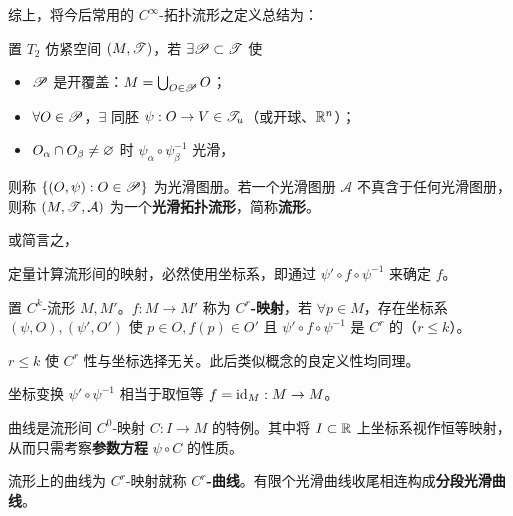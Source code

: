 综上，将今后常用的 $C^\infty$-拓扑流形之定义总结为：
\begin{tcolorbox}
\begin{definition}
    置 $T_2$ 仿紧空间 $(M,\mathscr T)$，若 $\exists\mathscr P\subset\mathscr T$ 使
    \begin{itemize}
        \item $\mathscr P$ 是开覆盖：$M = \bigcup_{O\in\mathscr P}O$；
        \item $\forall O\in\mathscr P$，$\exists$ 同胚 $\psi:O\to V\in\mathscr T_u$（或开球、$\mathbb{R}^n$）；
        \item $O_\alpha\cap O_\beta\ne\varnothing$ 时 $\psi_\alpha\circ\psi_\beta^{-1}$ 光滑，
    \end{itemize}
    则称 $\{(O,\psi):O\in\mathscr P\}$ 为光滑图册。若一个光滑图册 $\mathcal A$ 不真含于任何光滑图册，则称 $(M,\mathscr T,\mathcal A)$ 为一个\textbf{光滑拓扑流形}，简称\textbf{流形}。
\end{definition}
\end{tcolorbox}
或简言之，
\begin{center}
\end{center}

定量计算流形间的映射，必然使用坐标系，即通过 $\psi'\circ f\circ \psi^{-1}$ 来确定 $f$。
\begin{definition}
    置 $C^k$-流形 $M,M'$。$f:M\to M'$ 称为 $C^r$\textbf{-映射}，若 $\forall p\in M$，存在坐标系 $(\psi,O),(\psi',O')$ 使 $p\in O,f(p)\in O'$ 且 $\psi'\circ f\circ \psi^{-1}$ 是 $C^r$ 的（$r\leqslant k$）。
\end{definition}

\begin{remark}
    $r\leqslant k$ 使 $C^r$ 性与坐标选择无关。此后类似概念的良定义性均同理。
\end{remark}

\begin{example}
    坐标变换 $\psi'\circ \psi^{-1}$ 相当于取恒等 $f=\mathrm{id}_M:M\to M$。
\end{example}
\begin{example}
    曲线是流形间 $C^0$-映射 $C:I\to M$ 的特例。其中将 $I\subset\mathbb{R}$ 上坐标系视作恒等映射，从而只需考察\textbf{参数方程} $\psi\circ C$ 的性质。
\end{example}

\begin{definition}
    流形上的曲线为 $C^r$-映射就称 $C^r$\textbf{-曲线}。有限个光滑曲线收尾相连构成\textbf{分段光滑曲线}。
\end{definition}

